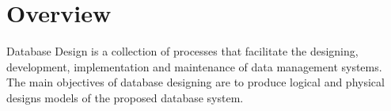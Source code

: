 \documentclass[../../DD.tex]{subfiles}
\begin{document}
\section{Overview \label{sect:5.1}}

	Database Design is a collection of processes that facilitate the designing, development, implementation and maintenance of  data management systems. \\
	The main objectives of database designing are to produce logical and physical designs models of the proposed database system.
	
\end{document}
